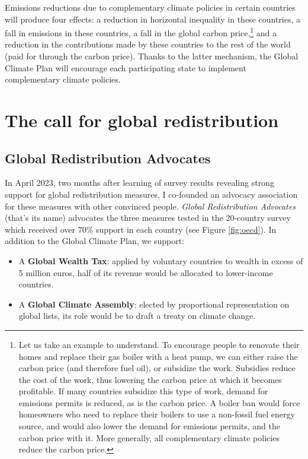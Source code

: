 \documentclass[a5paper,english,openany]{memoir}
\begin{document}
Emissions reductions due to complementary climate policies in certain countries 
will produce four effects: a reduction in horizontal inequality in these countries, a fall in emissions in these countries, a fall in the global carbon price,\footnote{Let us take an example to understand. 
To encourage people to renovate their homes and replace their gas boiler with a heat pump, we can either raise the carbon price (and therefore fuel oil), or subsidize the work. 
Subsidies reduce the cost of the work, thus lowering the carbon price at which it becomes profitable. 
If many countries subsidize this type of work, demand for emissions permits is reduced, as is the carbon price. 
A boiler ban would force homeowners who need to replace their boilers to use a non-fossil fuel energy source, and would also lower the demand for emissions permits, and the carbon price with it. More generally, all complementary climate policies reduce the carbon price.} 
and a reduction in the contributions made by these countries to the rest of the world (paid for through the carbon price). Thanks to the latter mechanism, the Global Climate Plan will %
encourage each participating state to implement complementary climate policies. 


\chapter{The call for global redistribution\label{ch:appel}}

\section{Global Redistribution Advocates}

In April 2023, two months after learning of survey results revealing strong support for global redistribution measures, I co-founded an advocacy association for these measures with other convinced people. \textit{Global Redistribution Advocates} (that's its name) advocates the three measures tested in the 20-country survey which received over 70\% support in each country (see Figure \ref{fig:oecd}). In addition to the Global Climate Plan, we support: 
\begin{itemize}
  \item A \textbf{Global Wealth Tax}: applied by voluntary countries to wealth in excess of 5 million euros, half of its revenue would be allocated to lower-income countries.
  \item A \textbf{Global Climate Assembly}: elected by proportional representation on global lists, its role would be to draft a treaty on climate change.
\end{itemize}
\end{document}
